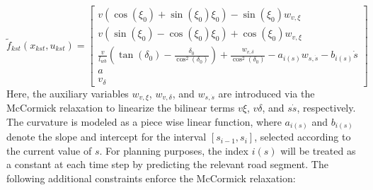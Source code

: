 \begin{equation}
	\label{eq:kst_final_dynamics}
	\tilde{f}_{kst}(x_{kst}, u_{kst}) =
	\begin{bmatrix}
		v (\cos(\xi_0) + \sin(\xi_0)\xi_0) - \sin(\xi_0) w_{v,\xi}                                                                                                 \\[8pt]
		v (\sin(\xi_0) - \cos(\xi_0)\xi_0) + \cos(\xi_0) w_{v,\xi}                                                                                                 \\[8pt]
		\frac{v}{l_{wb}} (\tan(\delta_0) - \frac{\delta_0}{\cos^2(\delta_0)}) + \frac{w_{v,\delta}}{\cos^2(\delta_0)}  - a_{i(s)} w_{s,\dot{s}} - b_{i(s)} \dot{s} \\[8pt]
		a                                                                                                                                                          \\[8pt]
		v_\delta
	\end{bmatrix}
\end{equation}
Here, the auxiliary variables $w_{v,\xi}$, $w_{v,\delta}$, and $w_{s,\dot{s}}$ are introduced via the McCormick relaxation to linearize the bilinear
terms $v\xi$, $v\delta$, and $s\dot{s}$, respectively.
The curvature is modeled as a piece wise linear function, where $a_{i(s)}$ and $b_{i(s)}$ denote the slope and intercept for the interval $[s_{i-1},
			s_i]$, selected according to the current value of $s$.
For planning purposes, the index $i(s)$ will be treated as a constant at each time step by predicting the relevant road segment.
The following additional constraints enforce the McCormick relaxation:
